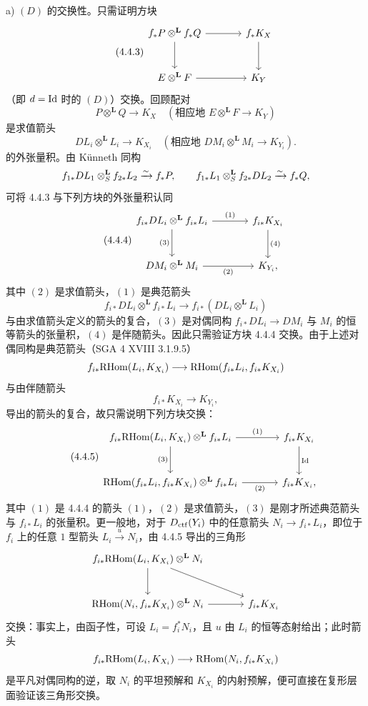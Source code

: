 \begin{prooftext}[证明]
a) $(D)$ 的交换性。只需证明方块
\begin{equation}
\tag{4.4.3}
\begin{tikzcd}[column sep=large,row sep=large]
f_*P\otimes^{\mathbf L}f_*Q \arrow[r] \arrow[d] & f_*K_X \arrow[d]\\
E\otimes^{\mathbf L}F \arrow[r] & K_Y
\end{tikzcd}
\end{equation}
（即 $d=\mathrm{Id}$ 时的 $(D)$）交换。回顾配对
\[
P\otimes^{\mathbf L}Q\longrightarrow K_X
\quad(\text{相应地 }E\otimes^{\mathbf L}F\longrightarrow K_Y)
\]
是求值箭头
\[
DL_i\otimes^{\mathbf L}L_i\longrightarrow K_{X_i}
\quad(\text{相应地 }DM_i\otimes^{\mathbf L}M_i\longrightarrow K_{Y_i}).
\]
的外张量积。由 Künneth 同构
\[
f_{1*}DL_1\otimes_S^{\mathbf L} f_{2*}L_2 \xrightarrow{\sim} f_*P,\qquad
f_{1*}L_1\otimes_S^{\mathbf L} f_{2*}DL_2 \xrightarrow{\sim} f_*Q,
\]
可将 4.4.3 与下列方块的外张量积认同
\begin{equation}
\tag{4.4.4}
\begin{tikzcd}[column sep=large,row sep=large]
f_{i*}DL_i\otimes^{\mathbf L} f_{i*}L_i
 \arrow[r,"(1)"] \arrow[d,"(3)"'] &
f_{i*}K_{X_i} \arrow[d,"(4)"]\\
DM_i\otimes^{\mathbf L}M_i \arrow[r,"(2)"'] & K_{Y_i},
\end{tikzcd}
\end{equation}
其中 $(2)$ 是求值箭头，$(1)$ 是典范箭头
\[
f_{i*}DL_i\otimes^{\mathbf L} f_{i*}L_i\longrightarrow f_{i*}(DL_i\otimes^{\mathbf L}L_i)
\]
与由求值箭头定义的箭头的复合，$(3)$ 是对偶同构 $f_{i*}DL_i\longrightarrow DM_i$ 与 $M_i$ 的恒等箭头的张量积，$(4)$ 是伴随箭头。因此只需验证方块 4.4.4 交换。由于上述对偶同构是典范箭头（SGA 4 XVIII 3.1.9.5）
\[
f_{i*}\mathrm{RHom}(L_i,K_{X_i})\longrightarrow \mathrm{RHom}(f_{i*}L_i,f_{i*}K_{X_i})
\]
与由伴随箭头
\[
f_{i*}K_{X_i}\longrightarrow K_{Y_i},
\]
导出的箭头的复合，故只需说明下列方块交换：
\begin{equation}
\tag{4.4.5}
\begin{tikzcd}[column sep=large,row sep=large]
f_{i*}\RHom(L_i,K_{X_i})\otimes^{\mathbf L} f_{i*}L_i
 \arrow[r,"(1)"] \arrow[d,"(3)"'] &
f_{i*}K_{X_i} \arrow[d,"\Id"]\\
\RHom(f_{i*}L_i,f_{i*}K_{X_i})\otimes^{\mathbf L} f_{i*}L_i
 \arrow[r,"(2)"'] &
f_{i*}K_{X_i},
\end{tikzcd}
\end{equation}
其中 $(1)$ 是 4.4.4 的箭头 $(1)$，$(2)$ 是求值箭头，$(3)$ 是刚才所述典范箭头与 $f_{i*}L_i$ 的张量积。更一般地，对于 $D_{\mathrm{ctf}}(Y_i)$ 中的任意箭头 $N_i\longrightarrow f_{i*}L_i$，即位于 $f_i$ 上的任意 $1$ 型箭头 $L_i\xrightarrow{u}N_i$，由 4.4.5 导出的三角形
\[
\begin{tikzcd}[column sep=large,row sep=large]
f_{i*}\RHom(L_i,K_{X_i})\otimes^{\mathbf L}N_i
 \arrow[dr] \arrow[d] & \\
\RHom(N_i,f_{i*}K_{X_i})\otimes^{\mathbf L}N_i \arrow[r] &
f_{i*}K_{X_i}
\end{tikzcd}
\]
交换：事实上，由函子性，可设 $L_i=f_i^*N_i$，且 $u$ 由 $L_i$ 的恒等态射给出；此时箭头
\[
f_{i*}\mathrm{RHom}(L_i,K_{X_i})\longrightarrow\mathrm{RHom}(N_i,f_{i*}K_{X_i})
\]
是平凡对偶同构的逆，取 $N_i$ 的平坦预解和 $K_{X_i}$ 的内射预解，便可直接在复形层面验证该三角形交换。


\end{prooftext}
